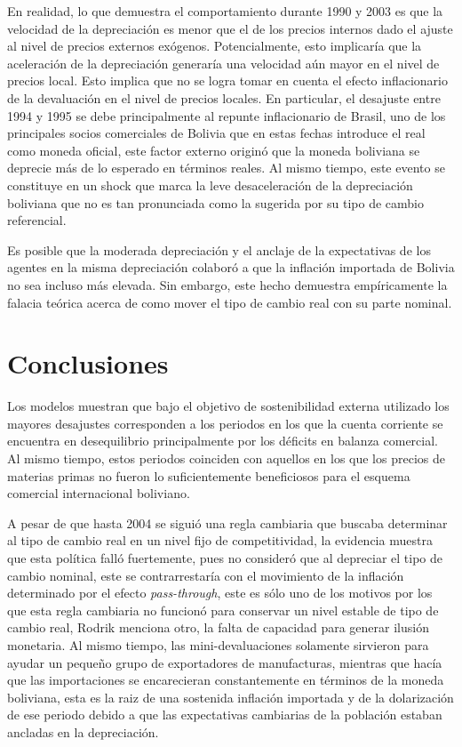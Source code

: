 \documentclass[12pt,letterpaper]{article}
\begin{document}
En realidad, lo que demuestra el comportamiento durante 1990 y 2003 es que la velocidad de la depreciación es menor que el de los precios internos dado el ajuste al nivel de precios externos exógenos. Potencialmente, esto implicaría que la aceleración de la depreciación generaría una velocidad aún mayor en el nivel de precios local. Esto implica que no se logra tomar en cuenta el efecto inflacionario de la devaluación en el nivel de precios locales. En particular, el desajuste entre 1994 y 1995 se debe principalmente al repunte inflacionario de Brasil, uno de los principales socios comerciales de Bolivia que en estas fechas introduce el real como moneda oficial, este factor externo originó que la moneda boliviana se deprecie más de lo esperado en términos reales. Al mismo tiempo, este evento se constituye en un shock que marca la leve desaceleración de la depreciación boliviana que no es tan pronunciada como la sugerida por su tipo de cambio referencial.

Es posible que la moderada depreciación y el anclaje de la expectativas de los agentes en la misma depreciación colaboró a que la inflación importada de Bolivia no sea incluso más elevada. Sin embargo, este hecho demuestra empíricamente la falacia teórica acerca de como mover el tipo de cambio real con su parte nominal.











\section*{Conclusiones}\label{concl}

Los modelos muestran que bajo el objetivo de sostenibilidad externa utilizado los mayores desajustes corresponden a los periodos en los que la cuenta corriente se encuentra en desequilibrio principalmente por los déficits en balanza comercial. Al mismo tiempo, estos periodos coinciden con aquellos en los que los precios de materias primas no fueron lo suficientemente beneficiosos para el esquema comercial internacional boliviano.

A pesar de que hasta 2004 se siguió una regla cambiaria que buscaba determinar al tipo de cambio real en un nivel fijo de competitividad, la evidencia muestra que esta política falló fuertemente, pues no consideró que al depreciar el tipo de cambio nominal, este se contrarrestaría con el movimiento de la inflación determinado por el efecto \emph{pass-through}, este es sólo uno de los motivos por los que esta regla cambiaria no funcionó para conservar un nivel estable de tipo de cambio real, Rodrik menciona otro, la falta de capacidad para generar ilusión monetaria. Al mismo tiempo, las mini-devaluaciones solamente sirvieron para ayudar un pequeño grupo de exportadores de manufacturas, mientras que hacía que las importaciones se encarecieran constantemente en términos de la moneda boliviana, esta es la raiz de una sostenida inflación importada y de la dolarización de ese periodo debido a que las expectativas cambiarias de la población estaban ancladas en la depreciación.
\end{document}
